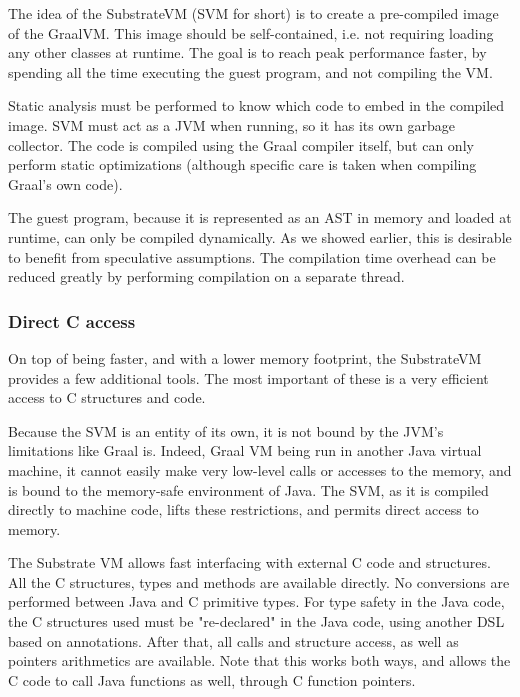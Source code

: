 \documentclass[twoside,11pt,a4paper]{article}
\begin{document}
The idea of the SubstrateVM (SVM for short) is to create a pre-compiled image of the GraalVM. This image should be self-contained, i.e. not requiring loading any other classes at runtime. The goal is to reach peak performance faster, by spending all the time executing the guest program, and not compiling the VM.

Static analysis must be performed to know which code to embed in the compiled image. SVM must act as a JVM when running, so it has its own garbage collector. The code is compiled using the Graal compiler itself, but can only perform static optimizations (although specific care is taken when compiling Graal's own code).

The guest program, because it is represented as an AST in memory and loaded at runtime, can only be compiled dynamically. As we showed earlier, this is desirable to benefit from speculative assumptions. The compilation time overhead can be reduced greatly by performing compilation on a separate thread.


\subsubsection{Direct C access}

On top of being faster, and with a lower memory footprint, the SubstrateVM provides a few additional tools. The most important of these is a very efficient access to C structures and code.

Because the SVM is an entity of its own, it is not bound by the JVM's limitations like Graal is. Indeed, Graal VM being run in another Java virtual machine, it cannot easily make very low-level calls or accesses to the memory, and is bound to the memory-safe environment of Java. The SVM, as it is compiled directly to machine code, lifts these restrictions, and permits direct access to memory. 

The Substrate VM allows fast interfacing with external C code and structures. All the C structures, types and methods are available directly. No conversions are performed between Java and C primitive types. For type safety in the Java code, the C structures used must be "re-declared" in the Java code, using another DSL based on annotations. After that, all calls and structure access, as well as pointers arithmetics are available. Note that this works both ways, and allows the C code to call Java functions as well, through C function pointers.
\end{document}
